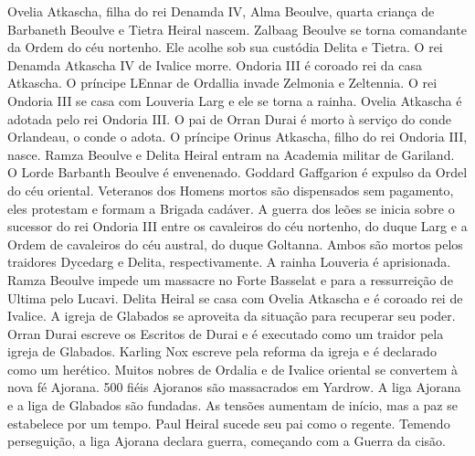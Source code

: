 %
 Ovelia Atkascha, filha do rei Denamda IV, Alma Beoulve, quarta criança de Barbaneth Beoulve e Tietra Heiral nascem. \nlwb
%
 Zalbaag Beoulve se torna comandante da Ordem do céu nortenho. Ele acolhe sob sua custódia Delita e Tietra. O rei Denamda Atkascha IV de Ivalice morre. Ondoria III é coroado rei da casa Atkascha. O príncipe LEnnar de Ordallia invade Zelmonia e Zeltennia. O rei Ondoria III se casa com Louveria Larg e ele se torna a rainha.\nlwb
%
 Ovelia Atkascha é adotada pelo rei Ondoria III. O pai de Orran Durai é morto à serviço do conde Orlandeau, o conde o adota. \nlwb
%
 O príncipe Orinus Atkascha, filho do rei Ondoria III, nasce. Ramza Beoulve e Delita Heiral entram na Academia militar de Gariland. O Lorde Barbanth Beoulve é envenenado. Goddard Gaffgarion é expulso da Ordel do céu oriental. 
Veteranos dos Homens mortos são dispensados sem pagamento, eles protestam e formam a Brigada cadáver. \nlwb
%
 A guerra dos leões se inicia sobre o sucessor do rei Ondoria III entre os cavaleiros do céu nortenho, do duque Larg e a Ordem de cavaleiros do céu austral, do duque Goltanna. 
Ambos são mortos pelos traidores Dycedarg e Delita, respectivamente. A rainha Louveria é aprisionada.
Ramza Beoulve impede um massacre no Forte Basselat e para a ressurreição de Ultima pelo Lucavi.
\nlwb
%
 Delita Heiral se casa com Ovelia Atkascha e é coroado rei de Ivalice. A igreja de Glabados se aproveita da situação para recuperar seu poder.
\nlwb
%
 Orran Durai escreve os Escritos de Durai e é executado como um traidor pela igreja de Glabados.\nlwb
%
 Karling Nox escreve pela reforma da igreja e é declarado como um herético. Muitos nobres de Ordalia e de Ivalice oriental se convertem à nova fé Ajorana.\nlwb
%
 500 fiéis Ajoranos são massacrados em Yardrow. A liga Ajorana e a liga de Glabados são fundadas.
As tensões aumentam de início, mas a paz se estabelece por um tempo.
\nlwb
%
 Paul Heiral sucede seu pai como o regente. Temendo perseguição, a liga Ajorana declara guerra, começando com a Guerra da cisão.
%
\clearpage
%
%
%
